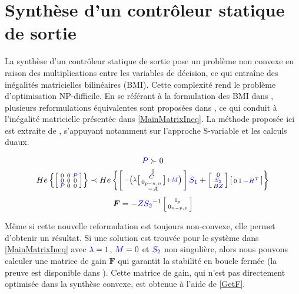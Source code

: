 \section{Synthèse d'un contrôleur statique de sortie}
\label{SOF Controller Synthesis}

La synthèse d'un contrôleur statique de sortie pose un problème non convexe en raison des multiplications entre les variables de décision, ce qui entraîne des inégalités matricielles bilinéaires (BMI). Cette complexité rend le problème d'optimisation NP-difficile. 
En se référant à la formulation des BMI dans \cite{ebihara2015}, plusieurs reformulations équivalentes sont proposées dans \cite{Arzelier2018}, ce qui conduit à l'inégalité matricielle présentée dans \eqref{MainMatrixIneq}. La méthode proposée ici est extraite de \cite{ebihara2015}, s'appuyant notamment sur l'approche S-variable et les calculs duaux.



\begin{equation}
\centering
  \begin{gathered}
        \textcolor{blue}{P} \succ 0 \\
        He\left\{ \smallmat{
            0 & 0 & \textcolor{blue}{P}\\
            0 & 0 & 0\\
            \textcolor{blue}{P} & 0 & 0
        }\right\}
    \prec
    He\left\{\smallmat{
        \mathbb{I}\\
            -\left( \textcolor{blue}{\lambda} \smallmat{
                C\\
                0_{p-n,n}                
            } + \textcolor{blue}{M} \right)\\
            -A
    }
    \textcolor{blue}{S_1} +
    \smallmat{
        0\\
        \textcolor{blue}{S_2}\\
        B\textcolor{blue}{Z}
    }
    \smallmat{
        0 & \mathbb{I} & -\textcolor{blue}{H}^T
    }\right\}
    \end{gathered}
    \label{MainMatrixIneq}
\end{equation}
\begin{equation}
    \boldsymbol{F} = -\textcolor{blue}{Z} \textcolor{blue}{S_2}^{-1} \left[ \begin{smallmatrix} \mathbb{I}_p \\ 0_{n-p,p}  \end{smallmatrix} \right]
    \label{GetF}
\end{equation}

Même si cette nouvelle reformulation est toujours non-convexe, elle permet d'obtenir un résultat. Si une solution est trouvée pour le système dans \eqref{MainMatrixIneq} avec $\textcolor{blue}{\lambda} = 1$, $\textcolor{blue}{M} = 0$ et $\textcolor{blue}{S_2}$ non singulière, alors nous pouvons calculer une matrice de gain $\boldsymbol{F}$ qui garantit la stabilité en boucle fermée (la preuve est disponible dans \cite{Arzelier2018}). Cette matrice de gain, qui n'est pas directement optimisée dans la synthèse convexe, est obtenue à l'aide de \eqref{GetF}. 

